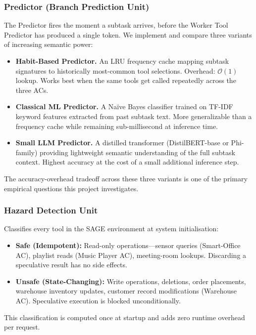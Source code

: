 \documentclass[conference]{IEEEtran}
\begin{document}
\subsubsection{Predictor (Branch Prediction Unit)}
The Predictor fires the moment a subtask arrives, before the Worker Tool
Predictor has produced a single token.
We implement and compare three variants of increasing semantic power:
\begin{itemize}[itemsep=3pt]
  \item \textbf{Habit-Based Predictor.}
        An LRU frequency cache mapping subtask signatures to historically
        most-common tool selections.
        Overhead: $\mathcal{O}(1)$ lookup.
        Works best when the same tools get called repeatedly across the three ACs.
  \item \textbf{Classical ML Predictor.}
        A Na\"{i}ve Bayes classifier trained on TF-IDF keyword features extracted
        from past subtask text.
        More generalizable than a frequency cache while remaining sub-millisecond
        at inference time.
  \item \textbf{Small LLM Predictor.}
        A distilled transformer (DistilBERT-base or Phi-family) providing
        lightweight semantic understanding of the full subtask context.
        Highest accuracy at the cost of a small additional inference step.
\end{itemize}
The accuracy-overhead tradeoff across these three variants is one of the primary
empirical questions this project investigates.

\subsubsection{Hazard Detection Unit}
Classifies every tool in the SAGE environment at system initialisation:
\begin{itemize}[itemsep=3pt]
  \item \textbf{Safe (Idempotent):} Read-only operations---sensor queries
        (Smart-Office AC), playlist reads (Music Player AC), meeting-room lookups.
        Discarding a speculative result has no side effects.
  \item \textbf{Unsafe (State-Changing):} Write operations, deletions, order
        placements, warehouse inventory updates, customer record modifications
        (Warehouse AC). Speculative execution is blocked unconditionally.
\end{itemize}
This classification is computed once at startup and adds zero runtime overhead
per request.
\end{document}
